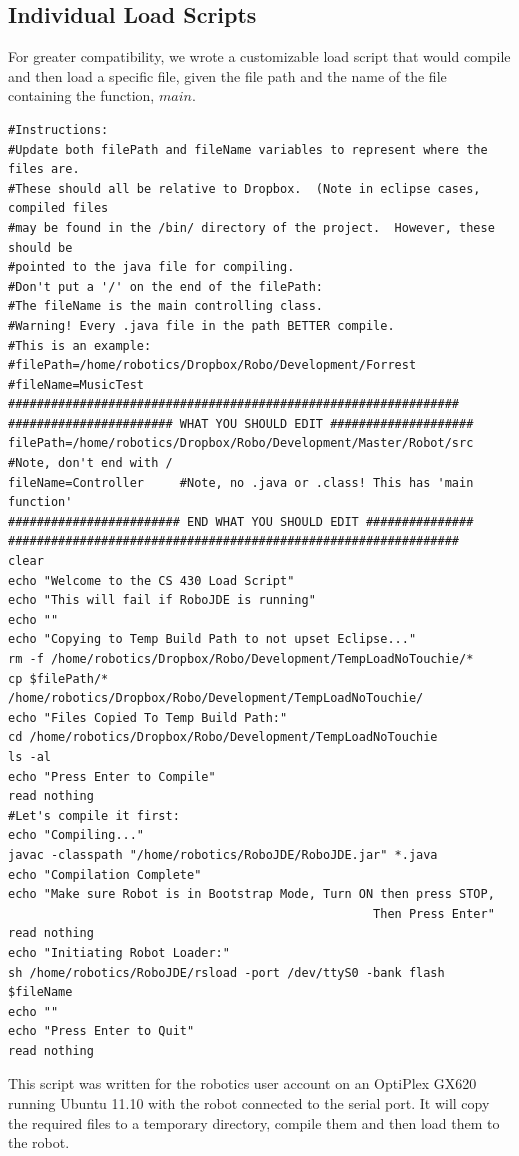 \documentclass[12pt]{article}
\begin{document}
\subsection{Individual Load Scripts}
For greater compatibility, we wrote a customizable load script that would compile and then load a specific file, given the file path and the name of the file containing the function, $main$.
\small{\begin{verbatim}
#Instructions:
#Update both filePath and fileName variables to represent where the files are.
#These should all be relative to Dropbox.  (Note in eclipse cases, compiled files 
#may be found in the /bin/ directory of the project.  However, these should be 
#pointed to the java file for compiling.
#Don't put a '/' on the end of the filePath:
#The fileName is the main controlling class.
#Warning! Every .java file in the path BETTER compile.
#This is an example:
#filePath=/home/robotics/Dropbox/Robo/Development/Forrest
#fileName=MusicTest
###############################################################
####################### WHAT YOU SHOULD EDIT ####################
filePath=/home/robotics/Dropbox/Robo/Development/Master/Robot/src 
#Note, don't end with /
fileName=Controller		#Note, no .java or .class! This has 'main function'
######################## END WHAT YOU SHOULD EDIT ###############
###############################################################
clear
echo "Welcome to the CS 430 Load Script"
echo "This will fail if RoboJDE is running"
echo ""
echo "Copying to Temp Build Path to not upset Eclipse..."
rm -f /home/robotics/Dropbox/Robo/Development/TempLoadNoTouchie/*
cp $filePath/* /home/robotics/Dropbox/Robo/Development/TempLoadNoTouchie/
echo "Files Copied To Temp Build Path:"
cd /home/robotics/Dropbox/Robo/Development/TempLoadNoTouchie
ls -al
echo "Press Enter to Compile"
read nothing
#Let's compile it first:
echo "Compiling..."
javac -classpath "/home/robotics/RoboJDE/RoboJDE.jar" *.java
echo "Compilation Complete"
echo "Make sure Robot is in Bootstrap Mode, Turn ON then press STOP, 
                                                   Then Press Enter"
read nothing
echo "Initiating Robot Loader:"
sh /home/robotics/RoboJDE/rsload -port /dev/ttyS0 -bank flash $fileName
echo ""
echo "Press Enter to Quit"
read nothing
\end{verbatim}}

This script was written for the robotics user account on an OptiPlex GX620 running Ubuntu 11.10 with the robot connected to the serial port.  It will copy the required files to a temporary directory, compile them and then load them to the robot.
\end{document}
